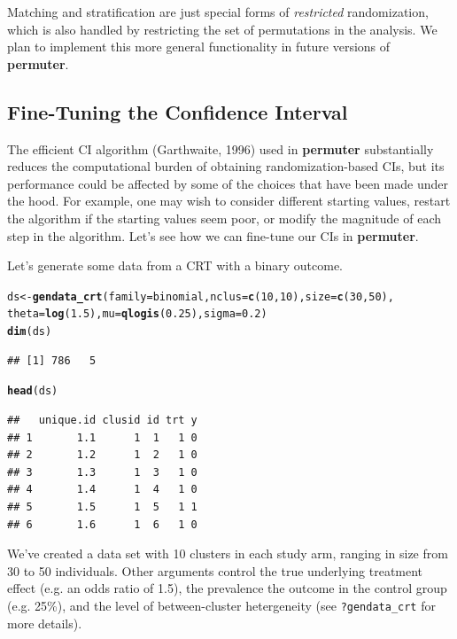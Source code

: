 \documentclass[12pt]{article}\usepackage[]{graphicx}\usepackage[]{color}
\makeatletter
\newcommand{\hlnum}[1]{\textcolor[rgb]{0.686,0.059,0.569}{#1}}%
\newcommand{\hlstd}[1]{\textcolor[rgb]{0.345,0.345,0.345}{#1}}%
\newcommand{\hlkwb}[1]{\textcolor[rgb]{0.69,0.353,0.396}{#1}}%
\newcommand{\hlkwc}[1]{\textcolor[rgb]{0.333,0.667,0.333}{#1}}%
\newcommand{\hlkwd}[1]{\textcolor[rgb]{0.737,0.353,0.396}{\textbf{#1}}}%
\newenvironment{kframe}{%
 \def\at@end@of@kframe{}%
 \ifinner\ifhmode%
  \def\at@end@of@kframe{\end{minipage}}%
  \begin{minipage}{\columnwidth}%
 \fi\fi%
 \def\FrameCommand##1{\hskip\@totalleftmargin \hskip-\fboxsep
 \colorbox{shadecolor}{##1}\hskip-\fboxsep
     \hskip-\linewidth \hskip-\@totalleftmargin \hskip\columnwidth}%
 \MakeFramed {\advance\hsize-\width
   \@totalleftmargin\z@ \linewidth\hsize
   \@setminipage}}%
 {\par\unskip\endMakeFramed%
 \at@end@of@kframe}
\newenvironment{knitrout}{}{} %
\makeatother
\begin{document}
Matching and stratification are just special forms of \textit{restricted} randomization, which is also handled by restricting the set of permutations in the analysis. We plan to implement this more general functionality in future versions of \textbf{permuter}.

\subsection{Fine-Tuning the Confidence Interval}
The efficient CI algorithm (Garthwaite, 1996) used in \textbf{permuter} substantially reduces the computational burden of obtaining randomization-based CIs, but its performance could be affected by some of the choices that have been made under the hood. For example, one may wish to consider different starting values, restart the algorithm if the starting values seem poor, or modify the magnitude of each step in the algorithm. Let's see how we can fine-tune our CIs in \textbf{permuter}.

Let's generate some data from a CRT with a binary outcome.
\begin{knitrout}
\color{fgcolor}\begin{kframe}
\begin{alltt}
\hlstd{ds} \hlkwb{<-} \hlkwd{gendata_crt}\hlstd{(}\hlkwc{family} \hlstd{= binomial,} \hlkwc{nclus} \hlstd{=} \hlkwd{c}\hlstd{(}\hlnum{10}\hlstd{,} \hlnum{10}\hlstd{),} \hlkwc{size} \hlstd{=} \hlkwd{c}\hlstd{(}\hlnum{30}\hlstd{,} \hlnum{50}\hlstd{),}
                  \hlkwc{theta} \hlstd{=} \hlkwd{log}\hlstd{(}\hlnum{1.5}\hlstd{),} \hlkwc{mu} \hlstd{=} \hlkwd{qlogis}\hlstd{(}\hlnum{0.25}\hlstd{),} \hlkwc{sigma} \hlstd{=} \hlnum{0.2}\hlstd{)}
\hlkwd{dim}\hlstd{(ds)}
\end{alltt}
\begin{verbatim}
## [1] 786   5
\end{verbatim}
\begin{alltt}
\hlkwd{head}\hlstd{(ds)}
\end{alltt}
\begin{verbatim}
##   unique.id clusid id trt y
## 1       1.1      1  1   1 0
## 2       1.2      1  2   1 0
## 3       1.3      1  3   1 0
## 4       1.4      1  4   1 0
## 5       1.5      1  5   1 1
## 6       1.6      1  6   1 0
\end{verbatim}
\end{kframe}
\end{knitrout}
\noindent We've created a data set with 10 clusters in each study arm, ranging in size from 30 to 50 individuals. Other arguments control the true underlying treatment effect (e.g. an odds ratio of 1.5), the prevalence the outcome in the control group (e.g. 25\%), and the level of between-cluster hetergeneity (see \texttt{?gendata\_crt} for more details).
\end{document}
